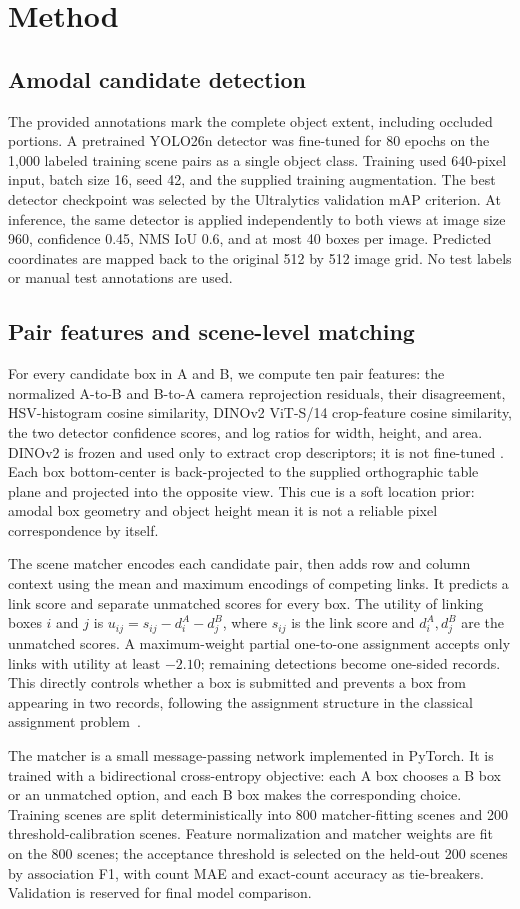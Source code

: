 \section{Method}
\subsection{Amodal candidate detection}
The provided annotations mark the complete object extent, including occluded portions. A pretrained YOLO26n detector was fine-tuned for 80 epochs on the 1,000 labeled training scene pairs as a single object class. Training used 640-pixel input, batch size 16, seed 42, and the supplied training augmentation. The best detector checkpoint was selected by the Ultralytics validation mAP criterion. At inference, the same detector is applied independently to both views at image size 960, confidence 0.45, NMS IoU 0.6, and at most 40 boxes per image. Predicted coordinates are mapped back to the original 512 by 512 image grid. No test labels or manual test annotations are used.

\subsection{Pair features and scene-level matching}
For every candidate box in A and B, we compute ten pair features: the normalized A-to-B and B-to-A camera reprojection residuals, their disagreement, HSV-histogram cosine similarity, DINOv2 ViT-S/14 crop-feature cosine similarity, the two detector confidence scores, and log ratios for width, height, and area. DINOv2 is frozen and used only to extract crop descriptors; it is not fine-tuned \cite{dinov2}. Each box bottom-center is back-projected to the supplied orthographic table plane and projected into the opposite view. This cue is a soft location prior: amodal box geometry and object height mean it is not a reliable pixel correspondence by itself.

The scene matcher encodes each candidate pair, then adds row and column context using the mean and maximum encodings of competing links. It predicts a link score and separate unmatched scores for every box. The utility of linking boxes $i$ and $j$ is $u_{ij}=s_{ij}-d_i^A-d_j^B$, where $s_{ij}$ is the link score and $d_i^A,d_j^B$ are the unmatched scores. A maximum-weight partial one-to-one assignment accepts only links with utility at least $-2.10$; remaining detections become one-sided records. This directly controls whether a box is submitted and prevents a box from appearing in two records, following the assignment structure in the classical assignment problem~\cite{kuhn1955}.

The matcher is a small message-passing network implemented in PyTorch. It is trained with a bidirectional cross-entropy objective: each A box chooses a B box or an unmatched option, and each B box makes the corresponding choice. Training scenes are split deterministically into 800 matcher-fitting scenes and 200 threshold-calibration scenes. Feature normalization and matcher weights are fit on the 800 scenes; the acceptance threshold is selected on the held-out 200 scenes by association F1, with count MAE and exact-count accuracy as tie-breakers. Validation is reserved for final model comparison.
